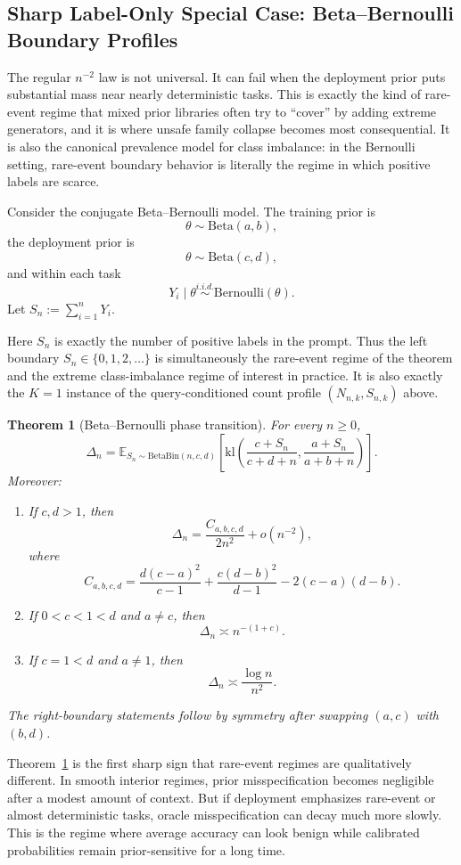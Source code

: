\documentclass{article}
\newtheorem{theorem}{Theorem}
\theoremstyle{definition}
\theoremstyle{remark}
\newcommand{\E}{\mathbb{E}}
\newcommand{\Ber}{\mathrm{Bernoulli}}
\newcommand{\BetaDist}{\mathrm{Beta}}
\newcommand{\BetaBin}{\mathrm{BetaBin}}
\newcommand{\klb}{\mathrm{kl}}
\begin{document}
\subsection{Sharp Label-Only Special Case: Beta--Bernoulli Boundary Profiles}

The regular $n^{-2}$ law is not universal. It can fail when the deployment prior puts substantial mass near nearly deterministic tasks. This is exactly the kind of rare-event regime that mixed prior libraries often try to ``cover'' by adding extreme generators, and it is where unsafe family collapse becomes most consequential. It is also the canonical prevalence model for class imbalance: in the Bernoulli setting, rare-event boundary behavior is literally the regime in which positive labels are scarce.

Consider the conjugate Beta--Bernoulli model. The training prior is
\[
\theta \sim \BetaDist(a,b),
\]
the deployment prior is
\[
\theta \sim \BetaDist(c,d),
\]
and within each task
\[
Y_i\mid \theta \stackrel{i.i.d.}{\sim} \Ber(\theta).
\]
Let $S_n:=\sum_{i=1}^n Y_i$.

Here $S_n$ is exactly the number of positive labels in the prompt. Thus the left boundary $S_n\in\{0,1,2,\dots\}$ is simultaneously the rare-event regime of the theorem and the extreme class-imbalance regime of interest in practice. It is also exactly the $K=1$ instance of the query-conditioned count profile $(N_{n,k},S_{n,k})$ above.

\begin{theorem}[Beta--Bernoulli phase transition]
\label{thm:beta}
For every $n\ge 0$,
\[
\Delta_n
=
\E_{S_n\sim \BetaBin(n,c,d)}
\left[
\klb\!\left(
\frac{c+S_n}{c+d+n},
\frac{a+S_n}{a+b+n}
\right)
\right].
\]
Moreover:
\begin{enumerate}[leftmargin=18pt]
\item If $c,d>1$, then
\[
\Delta_n
=
\frac{C_{a,b,c,d}}{2n^2}
+ o(n^{-2}),
\]
where
\[
C_{a,b,c,d}
=
\frac{d(c-a)^2}{c-1}
+
\frac{c(d-b)^2}{d-1}
- 2(c-a)(d-b).
\]
\item If $0<c<1<d$ and $a\neq c$, then
\[
\Delta_n \asymp n^{-(1+c)}.
\]
\item If $c=1<d$ and $a\neq 1$, then
\[
\Delta_n \asymp \frac{\log n}{n^2}.
\]
\end{enumerate}
The right-boundary statements follow by symmetry after swapping $(a,c)$ with $(b,d)$.
\end{theorem}

Theorem~\ref{thm:beta} is the first sharp sign that rare-event regimes are qualitatively different. In smooth interior regimes, prior misspecification becomes negligible after a modest amount of context. But if deployment emphasizes rare-event or almost deterministic tasks, oracle misspecification can decay much more slowly. This is the regime where average accuracy can look benign while calibrated probabilities remain prior-sensitive for a long time.
\end{document}
